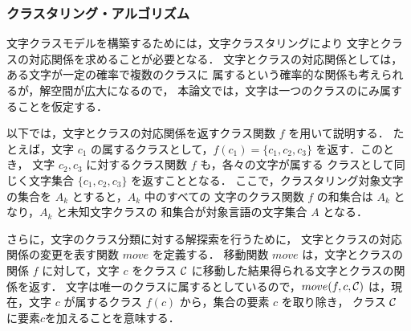 \subsubsection{クラスタリング・アルゴリズム}
\vspace{-1mm}

文字クラスモデルを構築するためには，文字クラスタリングにより
文字とクラスの対応関係を求めることが必要となる．
文字とクラスの対応関係としては，ある文字が一定の確率で複数のクラスに
属するという確率的な関係も考えられるが，解空間が広大になるので，
本論文では，文字は一つのクラスのにみ属することを仮定する．

以下では，文字とクラスの対応関係を返すクラス関数 $f$ を用いて説明する．
たとえば，文字 $c_1$ の属するクラスとして，$f(c_1)=\{c_1, c_2, c_3\}$
を返す．このとき，
文字 $c_2, c_3$ に対するクラス関数 $f$ も，各々の文字が属する
クラスとして同じく文字集合 $\{c_1, c_2, c_3\}$ を返すこととなる．
ここで，クラスタリング対象文字の集合を $A_k$ とすると，$A_k$ 中のすべての
文字のクラス関数 $f$ の和集合は $A_k$ となり，$A_k$ と未知文字クラスの
和集合が対象言語の文字集合 $A$ となる．

さらに，文字のクラス分類に対する解探索を行うために，
文字とクラスの対応関係の変更を表す関数 $move$ を定義する．
移動関数 $move$ は，文字とクラスの関係 $f$ に対して，文字 $c$ をクラス
${\cal C}$ に移動した結果得られる文字とクラスの関係を返す．
文字は唯一のクラスに属するとしているので，$move(f, c, {\cal C})$
は，現在，文字 $c$ が属するクラス $f(c)$ から，集合の要素 $c$ を取り除き，
クラス ${\cal C}$ に要素$c$を加えることを意味する．


